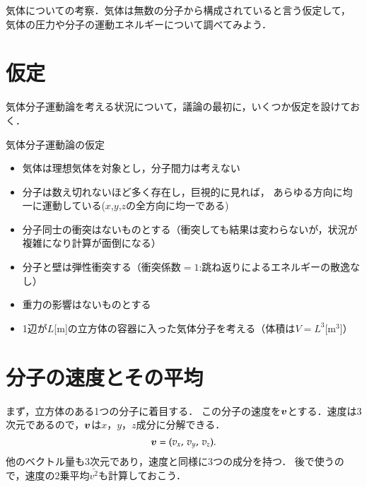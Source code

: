 ﻿%
\begin{mycomment}
    気体についての考察．気体は無数の分子から構成されていると言う仮定して，
    気体の圧力や分子の運動エネルギーについて調べてみよう．
\end{mycomment}

\section{仮定}
    気体分子運動論を考える状況について，議論の最初に，いくつか仮定を設けておく．
    \begin{itembox}[l]{気体分子運動論の仮定}
        \begin{itemize}
            \item 気体は理想気体を対象とし，分子間力は考えない
            \item 分子は数え切れないほど多く存在し，巨視的に見れば，
                  あらゆる方向に均一に運動している($x$,$y$,$z$の全方向に均一である)
            \item 分子同士の衝突はないものとする（衝突しても結果は変わらないが，状況が複雑になり計算が面倒になる）
            \item 分子と壁は弾性衝突する（衝突係数$=1$:跳ね返りによるエネルギーの散逸なし）
            \item 重力の影響はないものとする
            \item 1辺が$L$[m]の立方体の容器に入った気体分子を考える（体積は$V={L}^{3}$[m${}^{3}$]）
        \end{itemize}
    \end{itembox}

\section{分子の速度とその平均}
    まず，立方体のある1つの分子に着目する．
    この分子の速度を$\boldsymbol{v}$とする．速度は3次元であるので，$\boldsymbol{v}$は$x$，$y$，$z$成分に分解できる．
    \begin{equation}
        \boldsymbol{v} = ({v}_{x},\,{v}_{y},\,{v}_{z}).
    \end{equation}
    他のベクトル量も3次元であり，速度と同様に3つの成分を持つ．
    後で使うので，速度の2乗平均$\bar{{v}^{2}}$も計算しておこう．

